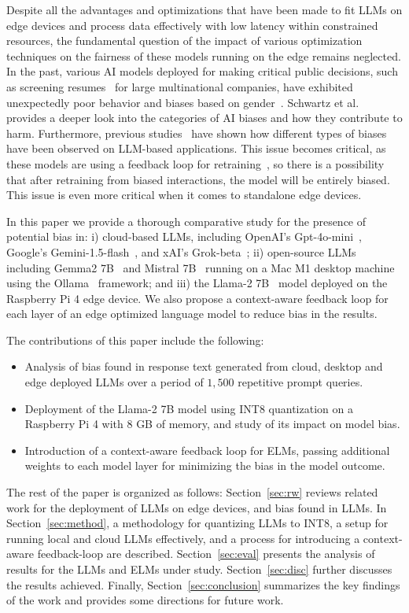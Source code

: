 Despite all the advantages and optimizations that have been made to fit LLMs on edge devices and process data effectively with low latency within constrained resources, the fundamental question of the impact of various optimization techniques on the fairness of these models running on the edge remains neglected. 
In the past, various AI models deployed for making critical public decisions, such as screening resumes~\cite{07} for large multinational companies, have exhibited unexpectedly poor behavior and biases based on gender~\cite{08}. 
Schwartz et al.~\cite{09} provides a deeper look into the categories of AI biases and how they contribute to harm. 
%
Furthermore, previous studies~\cite{wan2023kelly,taubenfeld2024systematic,ye2024justice} have shown how different types of biases have been observed on LLM-based applications. This issue becomes critical, as these models are using a feedback loop for retraining~\cite{liang2024learning}, so there is a possibility that after retraining from biased interactions, the model will be entirely biased. This issue is even more critical when it comes to standalone edge devices. 

In this paper we provide a thorough comparative study for the presence of potential bias in: i) cloud-based LLMs, including OpenAI's Gpt-4o-mini~\cite{10}, Google's Gemini-1.5-flash~\cite{11}, and xAI's Grok-beta~\cite{12}; ii) open-source LLMs including Gemma2 7B~\cite{gemma_2024} and Mistral 7B~\cite{jiang2023mistral} running on a Mac M1 desktop machine using the Ollama~\cite{13} framework; and iii) the Llama-2 7B~\cite{touvron2023llama} model deployed on the Raspberry Pi 4 edge device. 
We also propose a context-aware feedback loop for each layer of an edge optimized language model to reduce bias in the results. 

The contributions of this paper include the following: 

\begin{itemize}
  \item Analysis of bias found in response text generated from cloud, desktop and edge deployed LLMs over a period of $1,500$ repetitive prompt queries.

  \item Deployment of the Llama-2 7B model using INT8 quantization on a Raspberry Pi 4 with 8 GB of memory, and study of its impact on model bias. 
  
  \item Introduction of a context-aware feedback loop for ELMs, passing additional weights to each model layer for minimizing the bias in the model outcome.
\end{itemize}


The rest of the paper is organized as follows: Section~\ref{sec:rw} reviews related work for the deployment of LLMs on edge devices, and bias found in LLMs. 
In Section~\ref{sec:method}, a methodology for quantizing LLMs to INT8, a setup for running local and cloud LLMs effectively, and a process for introducing a context-aware feedback-loop are described. 
Section~\ref{sec:eval} presents the analysis of results for the LLMs and ELMs under study. 
Section~\ref{sec:disc} further discusses the results achieved.
Finally, Section~\ref{sec:conclusion} summarizes the key findings of the work and provides some directions for future work.